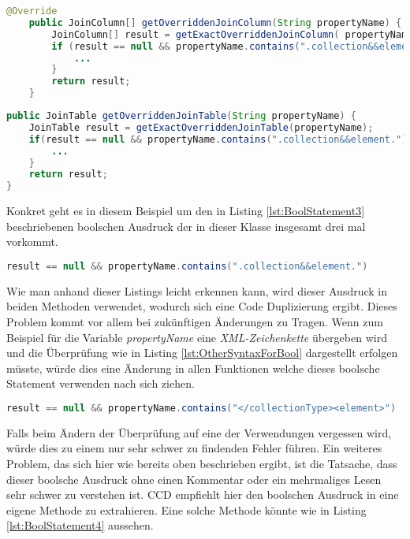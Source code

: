 \begin{lstlisting}[language=Java, caption=Komplexe boolsche Ausdrücke 1 Zeile 255 - 264, label=lst:BoolStatement1]
	@Override
	public JoinColumn[] getOverriddenJoinColumn(String propertyName) {
		JoinColumn[] result = getExactOverriddenJoinColumn( propertyName );
		if (result == null && propertyName.contains(".collection&&element.")) {
			...
		}
		return result;
	}
\end{lstlisting}

\begin{lstlisting}[language=Java, caption=Komplexe boolsche Ausdrücke 2 Zeile 305 - 313, label=lst:BoolStatement2]
public JoinTable getOverriddenJoinTable(String propertyName) {
	JoinTable result = getExactOverriddenJoinTable(propertyName);
	if(result == null && propertyName.contains(".collection&&element.")){
		...
	}
	return result;
}
\end{lstlisting}

\SuperPar Konkret geht es in diesem Beispiel um den in Listing \ref{lst:BoolStatement3} beschriebenen boolschen Ausdruck der in dieser Klasse insgesamt drei mal vorkommt.

\begin{lstlisting}[language=Java, caption=Boolscher Audruck, label=lst:BoolStatement3]
result == null && propertyName.contains(".collection&&element.")
\end{lstlisting}

\SuperPar Wie man anhand dieser Listings leicht erkennen kann, wird dieser Ausdruck in beiden Methoden verwendet, wodurch sich eine Code Duplizierung ergibt. Dieses Problem kommt vor allem bei zukünftigen Änderungen zu Tragen. Wenn zum Beispiel für die Variable \textit{propertyName} eine \textit{XML-Zeichenkette} übergeben wird und die Überprüfung wie in Listing \ref{lst:OtherSyntaxForBool} dargestellt erfolgen müsste, würde dies eine Änderung in allen Funktionen welche dieses boolsche Statement verwenden nach sich ziehen. 

\begin{lstlisting}[language=Java, caption=Boolscher Ausdruck neu, label=lst:OtherSyntaxForBool]
 result == null && propertyName.contains("</collectionType><element>")
\end{lstlisting}

\SuperPar Falls beim Ändern der Überprüfung auf eine der Verwendungen vergessen wird, würde dies zu einem nur sehr schwer zu findenden Fehler führen. Ein weiteres Problem, das sich hier wie bereits oben beschrieben ergibt, ist die Tatsache, dass dieser boolsche Ausdruck ohne einen Kommentar oder ein mehrmaliges Lesen sehr schwer zu verstehen ist. CCD empfiehlt hier den boolschen Ausdruck in eine eigene Methode zu extrahieren. Eine solche Methode könnte wie in Listing \ref{lst:BoolStatement4} aussehen.

